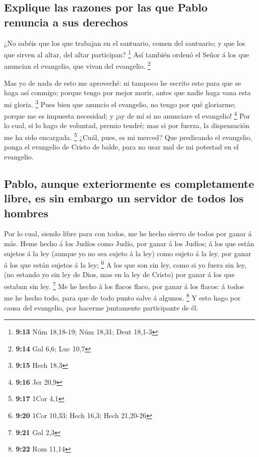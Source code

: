 \hypertarget{explique-las-razones-por-las-que-pablo-renuncia-a-sus-derechos}{%
\subsection{Explique las razones por las que Pablo renuncia a sus
derechos}\label{explique-las-razones-por-las-que-pablo-renuncia-a-sus-derechos}}

 ¿No sabéis que los que trabajan en el santuario, comen del
santuario; y que los que sirven al altar, del altar participan?
\footnote{\textbf{9:13} Núm 18,18-19; Núm 18,31; Deut 18,1-3}
 Así también ordenó el Señor á los que anuncian el
evangelio, que vivan del evangelio. \footnote{\textbf{9:14} Gal 6,6; Luc
  10,7}

 Mas yo de nada de esto me aproveché: ni tampoco he escrito
esto para que se haga así conmigo; porque tengo por mejor morir, antes
que nadie haga vana esta mi gloria. \footnote{\textbf{9:15} Hech 18,3}
 Pues bien que anuncio el evangelio, no tengo por qué
gloriarme; porque me es impuesta necesidad; y ¡ay de mí si no anunciare
el evangelio! \footnote{\textbf{9:16} Jer 20,9}  Por lo
cual, si lo hago de voluntad, premio tendré; mas si por fuerza, la
dispensación me ha sido encargada. \footnote{\textbf{9:17} 1Cor 4,1}
 ¿Cuál, pues, es mi merced? Que predicando el evangelio,
ponga el evangelio de Cristo de balde, para no usar mal de mi potestad
en el evangelio.

\hypertarget{pablo-aunque-exteriormente-es-completamente-libre-es-sin-embargo-un-servidor-de-todos-los-hombres}{%
\subsection{Pablo, aunque exteriormente es completamente libre, es sin
embargo un servidor de todos los
hombres}\label{pablo-aunque-exteriormente-es-completamente-libre-es-sin-embargo-un-servidor-de-todos-los-hombres}}

 Por lo cual, siendo libre para con todos, me he hecho
siervo de todos por ganar á más.  Heme hecho á los Judíos
como Judío, por ganar á los Judíos; á los que están sujetos á la ley
(aunque yo no sea sujeto á la ley) como sujeto á la ley, por ganar á los
que están sujetos á la ley; \footnote{\textbf{9:20} 1Cor 10,33; Hech
  16,3; Hech 21,20-26}  A los que son sin ley, como si yo
fuera sin ley, (no estando yo sin ley de Dios, mas en la ley de Cristo)
por ganar á los que estaban sin ley. \footnote{\textbf{9:21} Gal 2,3}
 Me he hecho á los flacos flaco, por ganar á los flacos: á
todos me he hecho todo, para que de todo punto salve á algunos.
\footnote{\textbf{9:22} Rom 11,14}  Y esto hago por causa
del evangelio, por hacerme juntamente participante de él.

